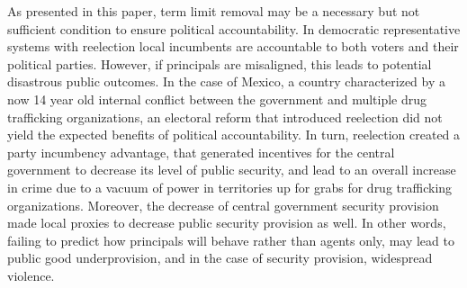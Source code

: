 \documentclass[12pt]{amsart}
\makeatletter
\def\section{\@startsection{section}{1}
	\z@{1.0\linespacing\@plus\linespacing}{.5\linespacing}{\Large}}
\numberwithin{equation}{section}
\theoremstyle{definition}
\theoremstyle{definition}
\theoremstyle{definition}
\makeatother
\begin{document}
\section{Conclusion}
   
As presented in this paper, term limit removal may be a necessary but not sufficient condition to ensure political accountability. In democratic representative systems with reelection local incumbents are accountable to both voters and their political parties. However, if principals are misaligned, this leads to potential disastrous public outcomes. In the case of Mexico, a country characterized by a now 14 year old internal conflict between the government and multiple drug trafficking organizations, an electoral reform that introduced reelection did not yield the expected benefits of political accountability. In turn, reelection created a party incumbency advantage, that generated incentives for the central government to decrease its level of public security, and lead to an overall increase in crime due to a vacuum of power in territories up for grabs for drug trafficking organizations. Moreover, the decrease of central government security provision made local proxies to decrease public security provision as well. In other words, failing to predict how principals will behave rather than agents only, may lead to public good underprovision, and in the case of security provision, widespread violence.


         
                
\clearpage   

 
    
\end{document}
